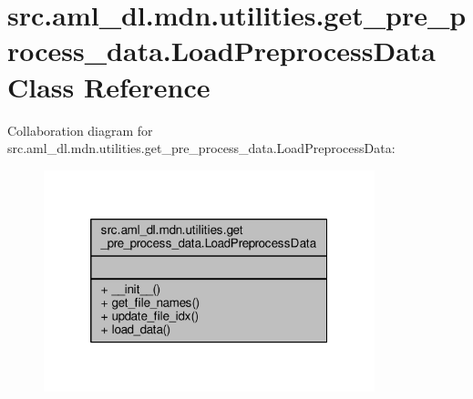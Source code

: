 \hypertarget{classsrc_1_1aml__dl_1_1mdn_1_1utilities_1_1get__pre__process__data_1_1_load_preprocess_data}{\section{src.\-aml\-\_\-dl.\-mdn.\-utilities.\-get\-\_\-pre\-\_\-process\-\_\-data.\-Load\-Preprocess\-Data Class Reference}
\label{classsrc_1_1aml__dl_1_1mdn_1_1utilities_1_1get__pre__process__data_1_1_load_preprocess_data}
}


Collaboration diagram for src.\-aml\-\_\-dl.\-mdn.\-utilities.\-get\-\_\-pre\-\_\-process\-\_\-data.\-Load\-Preprocess\-Data\-:\nopagebreak
\begin{figure}[H]
\begin{center}
\leavevmode
\includegraphics[width=272pt]{classsrc_1_1aml__dl_1_1mdn_1_1utilities_1_1get__pre__process__data_1_1_load_preprocess_data__coll__graph}
\end{center}
\end{figure}

